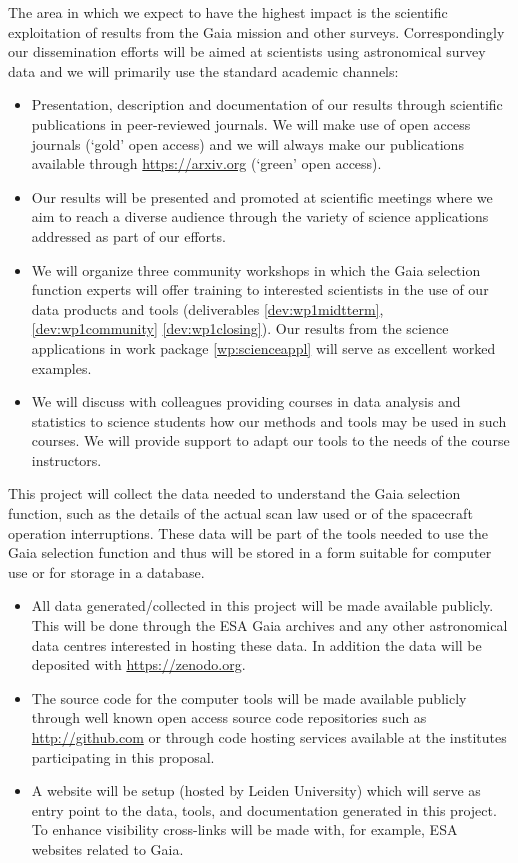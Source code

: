 The area in which we expect to have the highest impact is the scientific exploitation of results from the Gaia mission and other surveys. Correspondingly our dissemination efforts will be aimed at scientists using astronomical survey data and we will primarily use the standard academic channels:
\begin{itemize}
    \item Presentation, description and documentation of our results through scientific publications in peer-reviewed journals. We will make use of open access journals (`gold' open access) and we will always make our publications available through \url{https://arxiv.org} (`green' open access).
    \item Our results will be presented and promoted at scientific meetings where we aim to reach a diverse audience through the variety of science applications addressed as part of our efforts.
    \item We will organize three community workshops in which the Gaia selection function experts will offer training to interested scientists in the use of our data products and tools (deliverables \ref{dev:wp1midtterm}, \ref{dev:wp1community} \ref{dev:wp1closing}). Our results from the science applications in work package \ref{wp:scienceappl} will serve as excellent worked examples.
    \item We will discuss with colleagues providing courses in data analysis and statistics to science students how our methods and tools may be used in such courses. We will provide support to adapt our tools to the needs of the course instructors. 
\end{itemize}

This project will collect the data needed to understand the Gaia selection function, such as the details of the actual scan law used or of the spacecraft operation interruptions. These data will be part of the tools needed to use the Gaia selection function and thus will be stored in a form suitable for computer use or for storage in a database.
\begin{itemize}
    \item All data generated/collected in this project will be made available publicly. This will be done through the ESA Gaia archives and any other astronomical data centres interested in hosting these data. In addition the data will be deposited with \url{https://zenodo.org}.
    \item The source code for the computer tools will be made available publicly through well known open access source code repositories such as \url{http://github.com} or through code hosting services available at the institutes participating in this proposal.
    \item A website will be setup (hosted by Leiden University) which will serve as entry point to the data, tools, and documentation generated in this project. To enhance visibility cross-links will be made with, for example, ESA websites related to Gaia.
\end{itemize}


